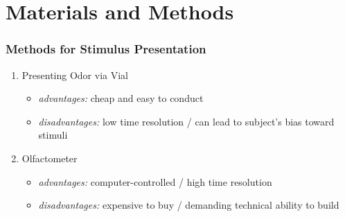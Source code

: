 \documentclass{beamer}
\begin{document}
\section{Materials and Methods} 

\begin{frame}
	\frametitle{Methods for Stimulus Presentation}
	\begin{enumerate}
		\item
		Presenting Odor via Vial
		\begin{itemize}
			\item
			\textit{advantages:} cheap and easy to conduct
			\item
			\textit{disadvantages:} low time resolution / can lead to subject's bias toward stimuli		
		\end{itemize}
		\item
		Olfactometer
		\begin{itemize}
			\item
			\textit{advantages:} computer-controlled / high time resolution
			\item
			\textit{disadvantages:} expensive to buy / demanding technical ability to build
		\end{itemize}

	\end{enumerate}
\end{frame}
\end{document}
